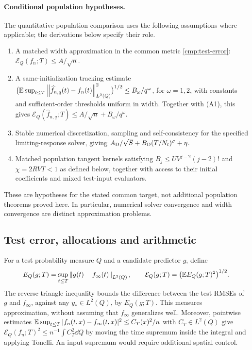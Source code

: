 \paragraph{Conditional population hypotheses.}
The quantitative population comparison uses the following assumptions where
applicable; the derivations below specify their role.
\begin{enumerate}
\item[(A1)] A matched width approximation in the common metric
\eqref{cmp:test-error}: $\mathcal E_Q(f_n;T)\le A/\sqrt n$.
\item[(A2)] A same-initialization tracking estimate
$\bigl(\mathbb{E}\sup_{t\le T}\left\lVert \widehat f_{n,q}(t)-f_n(t)\right\rVert_{L^2(Q)}^2\bigr)^{1/2}
\le B_\omega/q^\omega$, for $\omega=1,2$, with constants and sufficient-order
thresholds uniform in width.  Together with (A1), this gives
$\mathcal E_Q(\widehat f_{n,q};T)\le A/\sqrt n+B_\omega/q^\omega$.
\item[(A3)] Stable numerical discretization, sampling and self-consistency
for the specified limiting-response solver, giving
$A_{\rm D}/\sqrt S+B_{\rm D}(T/N_t)^\sigma+\eta$.
\item[(A4)] Matched population tangent kernels satisfying
$B_j\le UV^{j-2}(j-2)!$ and $\chi=2RVT<1$ as defined below, together with
access to their initial coefficients and mixed test-input evaluators.
\end{enumerate}
These are hypotheses for the stated common target, not additional population
theorems proved here.  In particular, numerical solver convergence and width
convergence are distinct approximation problems.

\subsection{Test error, allocations and arithmetic}
\label{app:comparison-opt}

For a test probability measure $Q$ and a candidate predictor $g$, define
\begin{equation}
 E_Q(g;T)=\sup_{t\le T}\left\lVert g(t)-f_\infty(t)\right\rVert_{L^2(Q)},\qquad
 \mathcal E_Q(g;T)=\bigl(\mathbb{E} E_Q(g;T)^2\bigr)^{1/2}.
 \label{cmp:test-error}
\end{equation}
The reverse triangle inequality bounds the difference between the test RMSEs
of $g$ and $f_\infty$, against any $y_*\in L^2(Q)$, by $E_Q(g;T)$.
This measures approximation, without assuming that $f_\infty$ generalizes well.
Moreover, pointwise estimates
$\mathbb{E}\sup_{t\le T}|f_n(t,x)-f_\infty(t,x)|^2\le C_T(x)^2/n$
with $C_T\in L^2(Q)$ give
$\mathcal E_Q(f_n;T)^2\le n^{-1}\int C_T^2\dd Q$
by moving the time supremum inside the integral and applying Tonelli.
An input supremum would require additional spatial control.

